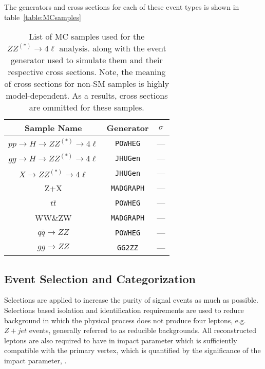 The generators and cross sections for each of these event types 
is shown in table~\ref{table:MCsamples}

\begin{table}
\begin{center}
\begin{tabular}{c|c|c}
\hline 
\hline
Sample Name & Generator & $\sigma$  \\ 
\hline
$pp\to H\to ZZ^{(*)}\to 4\ell$ & \verb+POWHEG+ & --- \\
$gg\to H\to ZZ^{(*)}\to 4\ell$ & \verb+JHUGen+ & --- \\
$X\to ZZ^{(*)}\to 4\ell$ & \verb+JHUGen+ & --- \\
Z+X & \verb+MADGRAPH+ & --- \\
$t\bar{t}$ & \verb+POWHEG+ & --- \\
WW\&ZW & \verb+MADGRAPH+ & --- \\
$q\bar{q}\to ZZ$ & \verb+POWHEG+ & --- \\
$gg\to ZZ$ & \verb+GG2ZZ+ & --- \\
\hline
\hline
\end{tabular}
\end{center}
\caption{List of MC samples used for the $ZZ^{(*)}\to 4\ell$ analysis.
along with the event generator used to simulate them and their
respective cross sections.  Note, the meaning of cross sections
for non-SM samples is highly model-dependent.  As a results, 
cross sections are ommitted for these samples.}
\label{table:HZZ4lMCsamples}
\end{table}

\subsection{Event Selection and Categorization}
\label{sec:HZZ4lselection}

Selections are applied to increase the purity of signal events 
as much as possible.  Selections based isolation and identification
requirements are used to reduce background in which the physical
process does not produce four leptons, e.g. $Z+jet$ events, 
generally referred to as reducible backgrounds.  All 
reconstructed leptons are also required to have in impact
parameter which is sufficiently compatible with the primary 
vertex, which is quantified by the significance of the impact 
parameter, \sip. 

